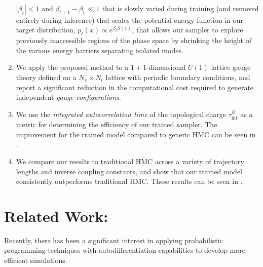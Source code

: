 \documentclass{article} %
\begin{document}
\begin{enumerate}
      \(|\beta_{t}|<1\) and \(\beta_{t+1} - \beta_{t} \ll 1\) that is slowly varied during training (and removed
      entirely during inference) that scales the potential energy function in our target distribution, \(p_{t}(x)\propto
      e^{\beta_{t}S(x)}\), that allows our sampler to explore previously inaccessible regions of the phase space by
      shrinking the height of the various energy barriers separating isolated modes.
   \item We apply the proposed method to a \(1+1\)-dimensional \(U(1)\) lattice gauge theory defined on a
      \(N_{x}\times N_{t}\) lattice with periodic boundary conditions, and report a significant reduction in the
      computational cost required to generate independent \emph{gauge configurations}.
   \item We use the \emph{integrated autocorrelation time} of the topological charge
      \(\tau_{\mathrm{int}}^{\mathcal{Q}}\) as a metric for determining the efficiency of our trained sampler.
      The improvement for the trained model compared to generic HMC can be seen in .
   \item We compare our results to traditional HMC across a variety of trajectory lengths and inverse coupling
      constants, and show that our trained model consistently outperforms traditional HMC.\@
      These results can be seen in .
\end{enumerate}
%
\section{\label{sec:related_work}Related Work:}
Recently, there has been a significant interest in applying probabilistic programming techniques with
autodifferentiation capabilities to develop more efficient simulations.
%
\end{document}
